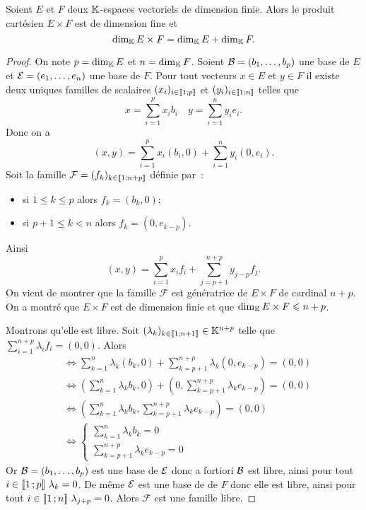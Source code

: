 \begin{theo}
  Soient \(E\) et \(F\) deux \(\mathbb{K}\)-espaces vectoriels de dimension finie. Alors
  le produit cartésien \(E \times F\) est de dimension fine et
  \begin{equation}
    \operatorname{dim}_{\mathbb{K}} E \times F = \operatorname{dim}_{\mathbb{K}} E + \operatorname{dim}_{\mathbb{K}} F.
  \end{equation}
\end{theo}
\begin{proof}
  On note \(p=\operatorname{dim}_{\mathbb{K}} E\) et \(n=\operatorname{dim}_{\mathbb{K}} F\). Soient \(\mathcal{B}=(b_1,\ldots, b_p)\)
  une base de \(E\) et \(\mathcal{E}=(e_1, \ldots, e_n)\) une base de \(F\). Pour tout
  vecteurs \(x \in E\) et \(y \in F\) il existe deux uniques familles de
  scalaires \((x_i)_{i \in \mathopen{\llbracket}1\mathclose{}\mathpunct{};p\mathclose{\rrbracket}}\) et \((y_i)_{i \in
  \mathopen{\llbracket}1\mathclose{}\mathpunct{};n\mathclose{\rrbracket}}\) telles que
  \begin{equation}
    x = \sum_{i=1}^p x_i b_i \quad y = \sum_{i=1}^n y_i e_i.
  \end{equation}
  Donc on a
  \begin{equation}
    (x,y) = \sum_{i=1}^p x_i (b_i,0) + \sum_{i=1}^n y_i (0,e_i).
  \end{equation}
  Soit la famille \(\mathcal{F}=(f_k)_{k \in \mathopen{\llbracket}1\mathclose{}\mathpunct{};n+p\mathclose{\rrbracket}}\)
  définie par~:
  \begin{itemize}
    \item si \(1 \leqslant k \leqslant p\) alors \(f_k=(b_k,0)\);
    \item si \(p+1 \leqslant k < n\) alors \(f_k=(0,e_{k-p})\).
  \end{itemize}
  Ainsi
  \begin{equation}
    (x,y)=\sum_{i=1}^p x_i f_i + \sum_{j=p+1}^{n+p} y_{j-p} f_j.
  \end{equation}
  On vient de montrer que la famille \(\mathcal{F}\) est génératrice de \(E
  \times F\) de cardinal \(n+p\). On a montré que \(E \times F\) est de
  dimension finie et que \(\operatorname{dim}_{\mathbb{K}} E\times F \leqslant n+p\).

  Montrons qu'elle est libre. Soit \((\lambda_k)_{k \in
  \mathopen{\llbracket}1\mathclose{}\mathpunct{};n+1\mathclose{\rrbracket}} \in \mathbb{K}^{n+p}\) telle que \(\sum_{i=1}^{n+p}
  \lambda_i f_i =(0,0)\). Alors
  \begin{align}
    &\iff \sum_{k=1}^n \lambda_k (b_k,0) + \sum_{k=p+1}^{n+p} \lambda_k
    (0,e_{k-p}) =(0,0)\\
    &\iff \left(\sum_{k=1}^n \lambda_k b_k,0 \right) +
    \left(0,\sum_{k=p+1}^{n+p} \lambda_k e_{k-p}\right) =(0,0)\\
    &\iff \left(\sum_{k=1}^n \lambda_k b_k,\sum_{k=p+1}^{n+p} \lambda_k
    e_{k-p}\right) = (0,0) \\
    &\iff \begin{cases} \sum_{k=1}^n \lambda_k b_k = 0 \\ \sum_{k=p+1}^{n+p}
    \lambda_k e_{k-p} =0 \end{cases}
  \end{align}
  Or \(\mathcal{B}=(b_1,\ldots, b_p)\) est une base de \(\mathcal{E}\) donc a fortiori \(\mathcal{B}\) est
  libre, ainsi pour tout \(i \in \intervalleentier{1}{p} \ \lambda_k=0\). De
  même \(\mathcal{E}\) est une base de de \(F\) donc elle est libre, ainsi pour tout \(i
  \in \mathopen{\llbracket}1\mathclose{}\mathpunct{};n\mathclose{\rrbracket} \ \lambda_{j+p}=0\). Alors \(\mathcal{F}\) est une
  famille libre.


\end{proof}
